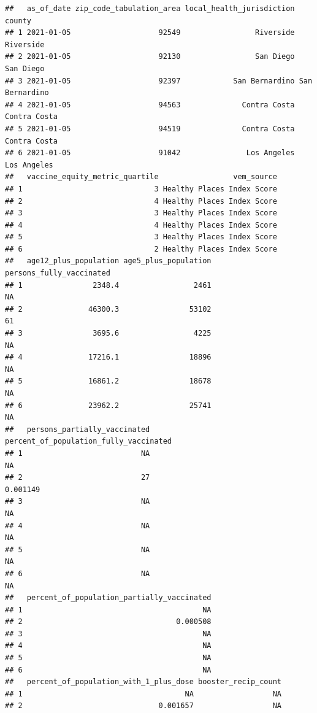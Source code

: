 \documentclass[
]{article}
\begin{document}
\begin{verbatim}
##   as_of_date zip_code_tabulation_area local_health_jurisdiction         county
## 1 2021-01-05                    92549                 Riverside      Riverside
## 2 2021-01-05                    92130                 San Diego      San Diego
## 3 2021-01-05                    92397            San Bernardino San Bernardino
## 4 2021-01-05                    94563              Contra Costa   Contra Costa
## 5 2021-01-05                    94519              Contra Costa   Contra Costa
## 6 2021-01-05                    91042               Los Angeles    Los Angeles
##   vaccine_equity_metric_quartile                 vem_source
## 1                              3 Healthy Places Index Score
## 2                              4 Healthy Places Index Score
## 3                              3 Healthy Places Index Score
## 4                              4 Healthy Places Index Score
## 5                              3 Healthy Places Index Score
## 6                              2 Healthy Places Index Score
##   age12_plus_population age5_plus_population persons_fully_vaccinated
## 1                2348.4                 2461                       NA
## 2               46300.3                53102                       61
## 3                3695.6                 4225                       NA
## 4               17216.1                18896                       NA
## 5               16861.2                18678                       NA
## 6               23962.2                25741                       NA
##   persons_partially_vaccinated percent_of_population_fully_vaccinated
## 1                           NA                                     NA
## 2                           27                               0.001149
## 3                           NA                                     NA
## 4                           NA                                     NA
## 5                           NA                                     NA
## 6                           NA                                     NA
##   percent_of_population_partially_vaccinated
## 1                                         NA
## 2                                   0.000508
## 3                                         NA
## 4                                         NA
## 5                                         NA
## 6                                         NA
##   percent_of_population_with_1_plus_dose booster_recip_count
## 1                                     NA                  NA
## 2                               0.001657                  NA

\end{verbatim}
\end{document}
